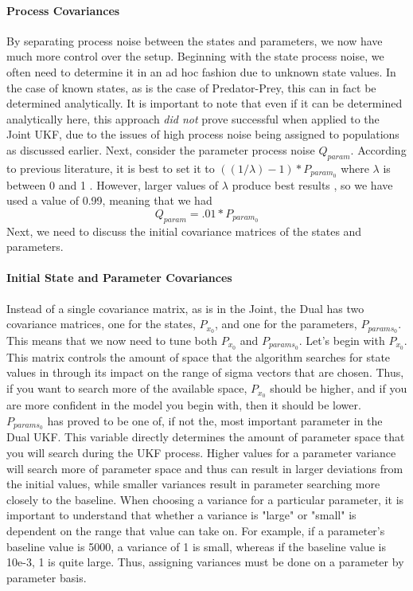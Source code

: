 \paragraph{Process Covariances}
By separating process noise between the states and parameters, we now have much more control over the setup. Beginning with the state process noise, we often need to determine it in an ad hoc fashion due to unknown state values. In the case of known states, as is the case of Predator-Prey, this can in fact be determined analytically. It is important to note that even if it can be determined analytically here, this approach \emph{did not} prove successful when applied to the Joint UKF, due to the issues of high process noise being assigned to populations as discussed earlier. Next, consider the parameter process noise $Q_{param}$. According to previous literature,
it is best to set it to $((1/\lambda) - 1) * P_{param_0}$ where $\lambda$ is between 0 and 1 \cite{GoveHollingerDual}. However, larger values of $\lambda$ produce best results \cite{GoveHollingerDual}, so we have used a value of 0.99, meaning that we had
\begin{equation}
Q_{param} = .01 * P_{param_0}
\end{equation}\cite{GoveHollingerDual}
 Next, we need to discuss the initial covariance matrices of the states and parameters.

\paragraph{Initial State and Parameter Covariances}
Instead of a single covariance matrix, as is in the Joint, the Dual has two covariance matrices, one for the states, $P_{x_0}$,  and one for the parameters, $P_{params_0}$. This means that we now need to tune both $P_{x_0}$ and $P_{params_0}$. Let's begin with $P_{x_0}$. This matrix controls the amount of space that the algorithm searches for state values in through its impact on the range of sigma vectors that are chosen. Thus, if you want to search more of the available space, $P_{x_0}$ should be higher, and if you are more confident in the model you begin with, then it should be lower.
\\
$P_{params_0}$ has proved to be one of, if not the, most important parameter in the Dual UKF. This variable directly determines the amount of parameter space that you will search during the UKF process. Higher values for a parameter variance will search more of parameter space and thus can result in larger deviations from the initial values, while smaller variances result in parameter searching more closely to the baseline. When choosing a variance for a particular parameter, it is important to understand that whether a variance is "large" or "small" is dependent on the range that value can take on. For example, if a parameter's baseline value is 5000, a variance of 1 is small, whereas if the baseline value is 10e-3, 1 is quite large. Thus, assigning variances must be done on a parameter by parameter basis. 


